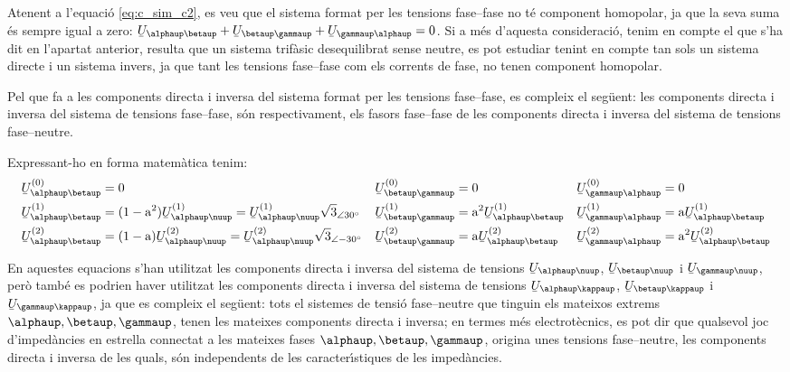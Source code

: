 Atenent a l'equaci\'{o} \eqref{eq:c_sim_c2}, es veu que el sistema
format per les tensions fase--fase no t\'{e} component homopolar, ja que
la seva suma  \'{e}s sempre igual a zero: $\cmplx{U}_{\alphaup\betaup} +
\cmplx{U}_{\betaup\gammaup} + \cmplx{U}_{\gammaup\alphaup} = 0$. Si a m\'{e}s
d'aquesta consideraci\'{o}, tenim en compte el que s'ha dit en l'apartat
anterior, resulta que un sistema trif\`{a}sic desequilibrat sense
neutre, es pot estudiar tenint en compte tan sols un sistema directe
i un sistema invers, ja que tant les tensions fase--fase com els
corrents de fase, no tenen component homopolar.

Pel que fa a les components directa i inversa del sistema format per
les tensions fase--fase, es compleix el seg\"{u}ent: les components
directa i inversa del sistema de tensions fase--fase, s\'{o}n
respectivament, els fasors fase--fase de les components directa i
inversa del sistema de tensions fase--neutre.

Expressant-ho en forma matem\`{a}tica tenim:
\begin{subequations}
\begin{align}
   \cmplx{U}_{\alphaup\betaup}\ap{(0)} &= 0 &
   \cmplx{U}_{\betaup\gammaup}\ap{(0)} &= 0 &
   \cmplx{U}_{\gammaup\alphaup}\ap{(0)} &= 0 \\
   \cmplx{U}_{\alphaup\betaup}\ap{(1)} &= (1-\au^2) \cmplx{U}_{\alphaup\nuup}\ap{(1)} =
   \cmplx{U}_{\alphaup\nuup}\ap{(1)} \sqrt{3}_{\angle 30\degree} &
   \cmplx{U}_{\betaup\gammaup}\ap{(1)} &= \au^2 \cmplx{U}_{\alphaup\betaup}\ap{(1)} &
   \cmplx{U}_{\gammaup\alphaup}\ap{(1)} &= \au \cmplx{U}_{\alphaup\betaup}\ap{(1)} \label{eq:c_sim_a3} \\
   \cmplx{U}_{\alphaup\betaup}\ap{(2)} &= (1-\au) \cmplx{U}_{\alphaup\nuup}\ap{(2)}  =
   \cmplx{U}_{\alphaup\nuup}\ap{(2)} \sqrt{3}_{\angle -30\degree}&
   \cmplx{U}_{\betaup\gammaup}\ap{(2)} &= \au \cmplx{U}_{\alphaup\betaup}\ap{(2)} &
   \cmplx{U}_{\gammaup\alphaup}\ap{(2)} &= \au^2 \cmplx{U}_{\alphaup\betaup}\ap{(2)} \label{eq:c_sim_b3}
\end{align}
\end{subequations}

En aquestes equacions s'han utilitzat les components directa i
inversa del sistema de tensions
$\cmplx{U}_{\alphaup\nuup}$, $\cmplx{U}_{\betaup\nuup}$ i $\cmplx{U}_{\gammaup\nuup}$,
per\`{o} tamb\'{e} es podrien haver utilitzat les components directa i
inversa del sistema de tensions
$\cmplx{U}_{\alphaup\kappaup}$, $\cmplx{U}_{\betaup\kappaup}$ i $\cmplx{U}_{\gammaup\kappaup}$,
ja que es compleix el seg\"{u}ent: tots el sistemes de tensi\'{o}
fase--neutre que tinguin els mateixos extrems $\alphaup, \betaup,
\gammaup$, tenen les mateixes components directa i inversa; en termes
m\'{e}s electrot\`{e}cnics, es pot dir que qualsevol joc d'imped\`{a}ncies en
estrella connectat a les mateixes fases $\alphaup, \betaup, \gammaup$,
origina unes tensions fase--neutre, les components directa i inversa
de les quals, s\'{o}n independents de les caracter\'{\i}stiques de les
imped\`{a}ncies.


